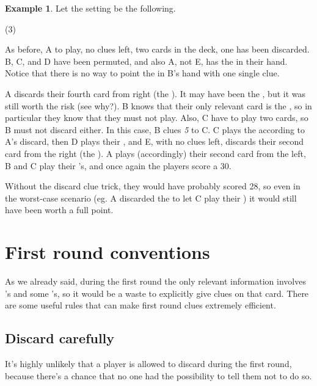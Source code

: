 \documentclass[a4paper]{article}
\theoremstyle{plain}
\theoremstyle{definition}
\newtheorem{example}[theorem]{Example}
\begin{document}
\begin{example}
	
	Let the setting be the following.
	
	\begin{tasks}(3)
		\task[+]      
		\task[A]    
		\task[B]    
		\task[C]    
		\task[D]    
		\task[E]    
	\end{tasks}
	
	As before, A to play, no clues left, two cards in the deck, one  has been discarded. B, C, and D have been permuted, and also A, not E, has the  in their hand. Notice that there is no way to point the  in B's hand with one single clue.
	
	A discards their fourth card from right (the ). It may have been the , but it was still worth the risk (see why?). B knows that their only relevant card is the , so in particular they know that they must not play. Also, C have to play two cards, so B must not discard either. In this case, B clues \textit{5} to C. C plays the  according to A's discard, then D plays their , and E, with no clues left, discards their second card from the right (the ). A plays (accordingly) their second card from the left, B and C play their 's, and once again the players score a 30.
\end{example}

Without the discard clue trick, they would have probably scored 28, so even in the worst-case scenario (eg. A discarded the  to let C play their ) it would still have been worth a full point.

\section{First round conventions}
\label{firstround}

As we already said, during the first round the only relevant information involves 's and some 's, so it would be a waste to explicitly give clues on that card. There are some useful rules that can make first round clues extremely efficient.

\subsection{Discard carefully}

It's highly unlikely that a player is allowed to discard during the first round, because there's a chance that no one had the possibility to tell them not to do so.
\end{document}
